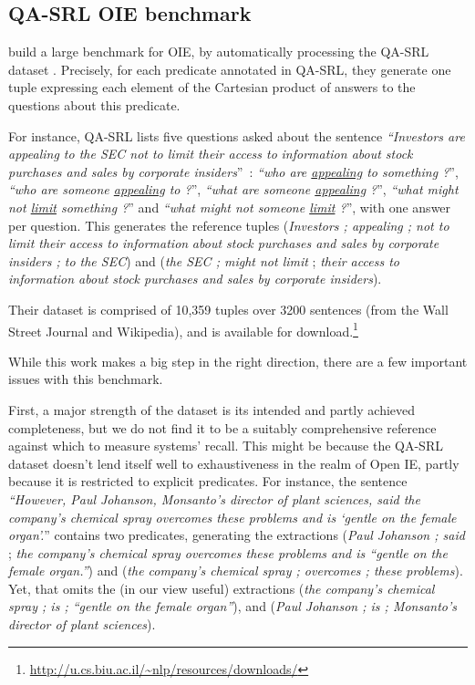 \pdfoutput=1 \documentclass[11pt, a4paper]{article}
\begin{document}
\subsection{QA-SRL OIE benchmark}
\label{sec:org4aff63d}
 build a large benchmark for OIE, by automatically
processing the QA-SRL dataset \cite{D15-1076}. Precisely, for each predicate
annotated in QA-SRL, they generate one tuple expressing each element of the
Cartesian product of answers to the questions about this
predicate.  

For instance, QA-SRL lists five questions asked about the sentence \emph{``Investors
are appealing to the SEC not to limit their access to} \emph{information about stock
purchases and sales by corporate insiders}''~: \emph{``who are \uline{appealing} to
something ?}'', \emph{``who are someone \uline{appealing} to ?}'', \emph{``what are someone
\uline{appealing} ?}'', \emph{``what might not \uline{limit} something ?}'' and \emph{``what might
not someone \uline{limit} ?}'', with one answer per question. This generates the
reference tuples (\emph{Investors ; appealing ; not to limit their access to
information} \emph{about stock purchases and sales by corporate insiders ; to the
SEC}) and (\emph{the SEC ; might not limit} ; \emph{their access to information about
stock purchases and sales by corporate insiders}).

Their dataset is comprised of 10,359 tuples over 3200 sentences (from the Wall
Street Journal and Wikipedia), and is available for
download.\footnote{\url{http://u.cs.biu.ac.il/\~nlp/resources/downloads/}} 

While this work makes a big step in the right direction, there are a few
important issues with this benchmark. 

First, a major strength of the dataset is its intended and partly achieved
completeness, but we do not find it to be a suitably comprehensive reference
against which to measure systems' recall. This might be because the QA-SRL
dataset doesn't lend itself well to exhaustiveness in the realm of Open IE,
partly because it is restricted to explicit predicates.  For instance, the
sentence \emph{``However, Paul Johanson, Monsanto's director of plant sciences, said
the company's chemical spray} \emph{overcomes these problems and is `gentle on the
female organ'.}'' contains two predicates, generating the extractions (\emph{Paul
Johanson ; said} ; \emph{the company's chemical spray overcomes these problems and
is ``gentle on the female organ.''}) and (\emph{the company's chemical spray ;
overcomes ; these problems}). Yet, that omits the (in our view useful)
extractions (\emph{the company's chemical spray ; is ; ``gentle on the female
organ''}), and (\emph{Paul Johanson ; is ; Monsanto's director of plant sciences}).
\end{document}
